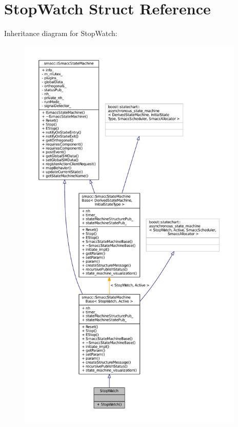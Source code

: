 \hypertarget{structStopWatch}{}\section{Stop\+Watch Struct Reference}
\label{structStopWatch}


Inheritance diagram for Stop\+Watch\+:
\nopagebreak
\begin{figure}[H]
\begin{center}
\leavevmode
\includegraphics[height=550pt]{structStopWatch__inherit__graph}
\end{center}
\end{figure}


